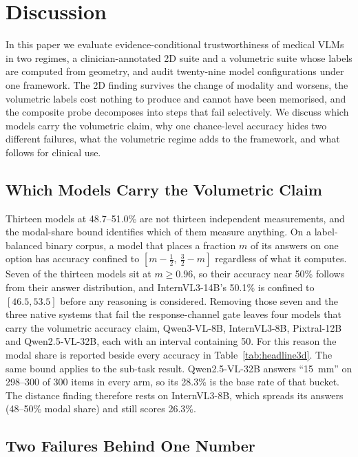 \section{Discussion}
\label{sec:discussion}

In this paper we evaluate evidence-conditional trustworthiness of medical
VLMs in two regimes, a clinician-annotated 2D suite and a volumetric suite
whose labels are computed from geometry, and audit twenty-nine model
configurations under one framework. The 2D finding survives the change of modality and worsens, the
volumetric labels cost nothing to produce and cannot have been memorised,
and the composite probe decomposes into steps that fail selectively. We
discuss which models carry the volumetric claim, why one chance-level
accuracy hides two different failures, what the volumetric regime adds to
the framework, and what follows for clinical use.

\subsection{Which Models Carry the Volumetric Claim}

Thirteen models at 48.7--51.0\% are not thirteen independent measurements,
and the modal-share bound identifies which of them measure anything. On a
label-balanced binary corpus, a model that places a fraction $m$ of its
answers on one option has accuracy confined to $[m-\tfrac12,\ \tfrac32-m]$
regardless of what it computes. Seven of the thirteen models sit at
$m\ge0.96$, so their accuracy near 50\% follows from their answer
distribution, and InternVL3-14B's 50.1\% is confined to $[46.5, 53.5]$
before any reasoning is considered. Removing those seven and the three
native systems that fail the response-channel gate leaves four models that
carry the volumetric accuracy claim, Qwen3-VL-8B, InternVL3-8B, Pixtral-12B
and Qwen2.5-VL-32B, each with an interval containing 50. For this reason the
modal share is reported beside every accuracy in Table~\ref{tab:headline3d}.
The same bound applies to the sub-task result. Qwen2.5-VL-32B answers
``15~mm'' on 298--300 of 300 items in every arm, so its 28.3\% is the base
rate of that bucket. The distance finding therefore rests on InternVL3-8B,
which spreads its answers (48--50\% modal share) and still scores 26.3\%.

\subsection{Two Failures Behind One Number}

